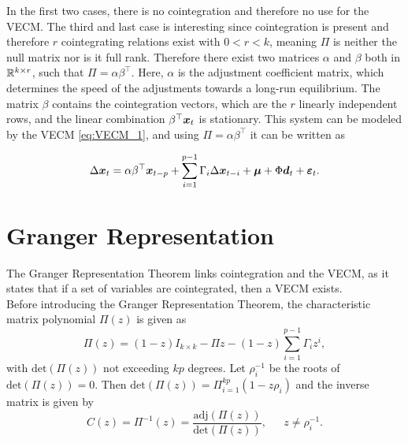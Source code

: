 In the first two cases, there is no cointegration and therefore no use for the VECM. The third and last case is interesting since cointegration is present and therefore $r$ cointegrating relations exist with $0<r<k$, meaning $\Pi$ is neither the null matrix nor is it full rank. Therefore there exist two matrices $\alpha$ and $\beta$ both in $\mathbb{R}^{k\times r}$, such that $\Pi=\alpha \beta^\top$. Here, $\alpha$ is the adjustment coefficient matrix, which determines the speed of the adjustments towards a long-run equilibrium. The matrix $\beta$ contains the cointegration vectors, which are the $r$ linearly independent rows, and the linear combination $\beta^\top \boldsymbol{x}_t$ is stationary. This system can be modeled by the VECM \eqref{eq:VECM_1}, and using $\Pi=\alpha\beta^\top$ it can be written as

\begin{equation}
\Delta \boldsymbol{x}_t = \alpha\beta^\top \boldsymbol{x}_{t-p} + \sum_{i=1}^{p-1}\Gamma_i\Delta \boldsymbol{x}_{t-i} + \boldsymbol{\mu} + \Phi \boldsymbol{d}_t + \boldsymbol{\varepsilon}_t.
    \label{eq:VECM_2}
\end{equation}

\section{Granger Representation}
The Granger Representation Theorem links cointegration and the VECM, as it states that if a set of variables are cointegrated, then a VECM exists.\\
%
\noindent 
Before introducing the Granger Representation Theorem, the characteristic matrix polynomial $\Pi(z)$ is given as
\begin{equation*}
    \Pi(z)=(1-z)I_{k\times k}-\Pi z-(1-z)\sum_{i=1}^{p-1}\Gamma_i z^i,
\end{equation*}
\noindent with $\text{det}(\Pi(z))$ not exceeding $kp$ degrees. Let $\rho^{-1}_i$ be the roots of $\text{det}(\Pi(z)) = 0$. Then $\text{det}(\Pi(z)) = \Pi^{kp}_{i=1}(1-z \rho_i)$ and the inverse matrix is given by 
\begin{equation*}
    C(z)=\Pi^{-1}(z)=\frac{\text{adj}(\Pi(z))}{\text{det}(\Pi(z))}, \phantom{asd} z\neq \rho^{-1}_i.
\end{equation*}

